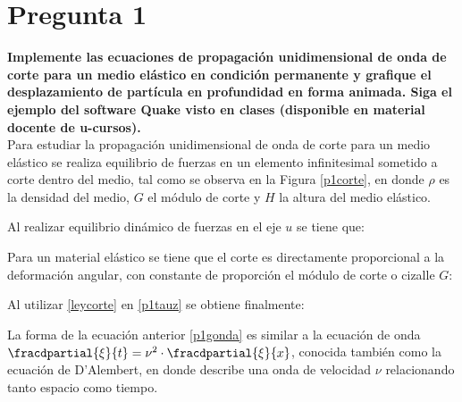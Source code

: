 \section{Pregunta 1}

\textbf{Implemente las ecuaciones de propagación unidimensional de onda de corte para un medio elástico en condición permanente y grafique el desplazamiento de partícula en profundidad en forma animada. Siga el ejemplo del software Quake visto en clases (disponible en material docente de u-cursos).} \\

Para estudiar la propagación unidimensional de onda de corte para un medio elástico se realiza equilibrio de fuerzas en un elemento infinitesimal sometido a corte dentro del medio, tal como se observa en la Figura \ref{p1corte}, en donde $\rho$ es la densidad del medio, $G$ el módulo de corte y $H$ la altura del medio elástico.


Al realizar equilibrio dinámico de fuerzas en el eje $u$ se tiene que:



Para un material elástico se tiene que el corte es directamente proporcional a la deformación angular, con constante de proporción el módulo de corte o cizalle $G$:


Al utilizar \eqref{leycorte} en \eqref{p1tauz} se obtiene finalmente:


La forma de la ecuación anterior \eqref{p1gonda} es similar a la ecuación de onda $\fracdpartial{\xi}{t} = \nu^2 \cdot \fracdpartial{\xi}{x}$, conocida también como la ecuación de D'Alembert, en donde describe una onda de velocidad $\nu$ relacionando tanto espacio como tiempo. \\

